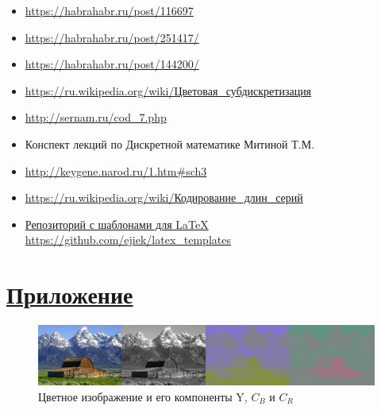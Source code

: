 \begin{itemize}

	\item\href{https://habrahabr.ru/post/116697}{https://habrahabr.ru/post/116697}
	\item\href{https://habrahabr.ru/post/251417/}{https://habrahabr.ru/post/251417/}
	\item\href{https://habrahabr.ru/post/144200/}{https://habrahabr.ru/post/144200/}
	\item\href{https://ru.wikipedia.org/wiki/%D0%A6%D0%B2%D0%B5%D1%82%D0%BE%D0%B2%D0%B0%D1%8F_%D1%81%D1%83%D0%B1%D0%B4%D0%B8%D1%81%D0%BA%D1%80%D0%B5%D1%82%D0%B8%D0%B7%D0%B0%D1%86%D0%B8%D1%8F}{https://ru.wikipedia.org/wiki/Цветовая\_субдискретизация}
	\item\href{http://sernam.ru/cod_7.php}{http://sernam.ru/cod\_7.php}
	\item Конспект лекций по Дискретной математике Митиной Т.М.
	\item\href{http://keygene.narod.ru/1.htm#sch3}{http://keygene.narod.ru/1.htm\#sch3} 
	\item\href{https://ru.wikipedia.org/wiki/%D0%9A%D0%BE%D0%B4%D0%B8%D1%80%D0%BE%D0%B2%D0%B0%D0%BD%D0%B8%D0%B5_%D0%B4%D0%BB%D0%B8%D0%BD_%D1%81%D0%B5%D1%80%D0%B8%D0%B9}{https://ru.wikipedia.org/wiki/Кодирование\_длин\_серий}
	\item\href{https://github.com/ejiek/latex_templates}{Репозиторий с шаблонами для \LaTeX\\ https://github.com/ejiek/latex\_templates}
	
\end{itemize}
\newpage

\section*{\hyperlink{toc}{Приложение}}

\begin{figure}[H]
	\begin{center}
		\includegraphics[scale=0.35]{../pics/YCbCr/YCbCr_separation_h.jpg}
		\caption{Цветное изображение и его компоненты Y, $C_B$ и $C_R$} 
		\label{pic:YCbCr:separation}
	\end{center}
\end{figure}

